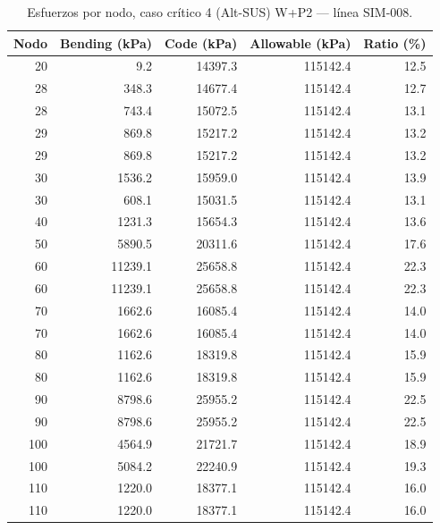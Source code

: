 \begin{table}[htbp]
  \centering
  \footnotesize
  \caption{Esfuerzos por nodo, caso crítico 4 (Alt-SUS) W+P2 — línea SIM-008.}
  \label{tab:esfuerzos-critico}
  \begin{tabular}{rrrrr}
    \toprule
    Nodo & Bending (\si{kPa}) & Code (\si{kPa}) & Allowable (\si{kPa}) & Ratio (\%) \\
    \midrule
    20 & \num{9.2} & \num{14397.3} & \num{115142.4} & 12.5 \\
    28 & \num{348.3} & \num{14677.4} & \num{115142.4} & 12.7 \\
    28 & \num{743.4} & \num{15072.5} & \num{115142.4} & 13.1 \\
    29 & \num{869.8} & \num{15217.2} & \num{115142.4} & 13.2 \\
    29 & \num{869.8} & \num{15217.2} & \num{115142.4} & 13.2 \\
    30 & \num{1536.2} & \num{15959.0} & \num{115142.4} & 13.9 \\
    30 & \num{608.1} & \num{15031.5} & \num{115142.4} & 13.1 \\
    40 & \num{1231.3} & \num{15654.3} & \num{115142.4} & 13.6 \\
    50 & \num{5890.5} & \num{20311.6} & \num{115142.4} & 17.6 \\
    60 & \num{11239.1} & \num{25658.8} & \num{115142.4} & 22.3 \\
    60 & \num{11239.1} & \num{25658.8} & \num{115142.4} & 22.3 \\
    70 & \num{1662.6} & \num{16085.4} & \num{115142.4} & 14.0 \\
    70 & \num{1662.6} & \num{16085.4} & \num{115142.4} & 14.0 \\
    80 & \num{1162.6} & \num{18319.8} & \num{115142.4} & 15.9 \\
    80 & \num{1162.6} & \num{18319.8} & \num{115142.4} & 15.9 \\
    90 & \num{8798.6} & \num{25955.2} & \num{115142.4} & 22.5 \\
    90 & \num{8798.6} & \num{25955.2} & \num{115142.4} & 22.5 \\
    100 & \num{4564.9} & \num{21721.7} & \num{115142.4} & 18.9 \\
    100 & \num{5084.2} & \num{22240.9} & \num{115142.4} & 19.3 \\
    110 & \num{1220.0} & \num{18377.1} & \num{115142.4} & 16.0 \\
    110 & \num{1220.0} & \num{18377.1} & \num{115142.4} & 16.0 \\

\end{tabular}
\end{table}
